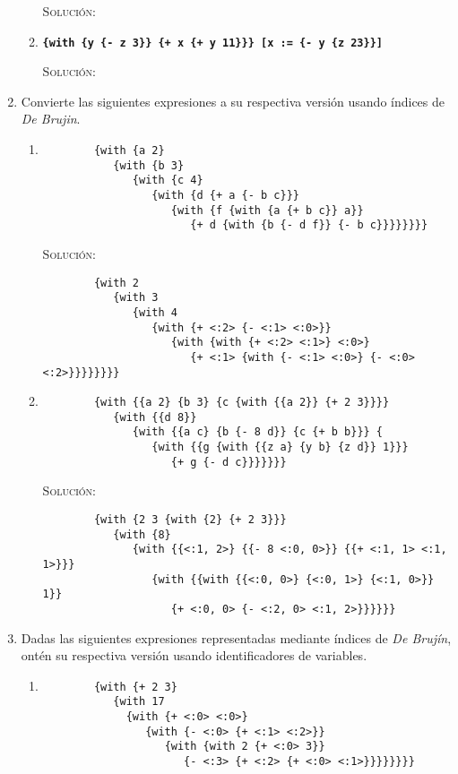 \documentclass[letterpaper,11pt]{article}
\begin{document}
\begin{enumerate}
\begin{enumerate}
        \textsc{Solución:}
        
        \item \texttt{\textbf{\{with \{y \{- z 3\}\} \{+ x \{+ y 11\}\}\} 
        [x := \{- y \{z 23\}\}]}}

        \textsc{Solución:}
    \end{enumerate}

    \item Convierte las siguientes expresiones a su respectiva versión usando
    índices de \textit{De Brujin}.
    \begin{enumerate}
        \item 
        \begin{verbatim}
        {with {a 2} 
           {with {b 3} 
              {with {c 4} 
                 {with {d {+ a {- b c}}} 
                    {with {f {with {a {+ b c}} a}} 
                       {+ d {with {b {- d f}} {- b c}}}}}}}}
        \end{verbatim}

        \textsc{Solución:}
        \begin{verbatim}
        {with 2 
           {with 3 
              {with 4
                 {with {+ <:2> {- <:1> <:0>}} 
                    {with {with {+ <:2> <:1>} <:0>} 
                       {+ <:1> {with {- <:1> <:0>} {- <:0> <:2>}}}}}}}}
        \end{verbatim}

        \item 
        \begin{verbatim}
        {with {{a 2} {b 3} {c {with {{a 2}} {+ 2 3}}}} 
           {with {{d 8}} 
              {with {{a c} {b {- 8 d}} {c {+ b b}}} {
                 {with {{g {with {{z a} {y b} {z d}} 1}}} 
                    {+ g {- d c}}}}}}}
        \end{verbatim}

        \textsc{Solución:}
        \begin{verbatim}
        {with {2 3 {with {2} {+ 2 3}}} 
           {with {8} 
              {with {{<:1, 2>} {{- 8 <:0, 0>}} {{+ <:1, 1> <:1, 1>}}} 
                 {with {{with {{<:0, 0>} {<:0, 1>} {<:1, 0>}} 1}} 
                    {+ <:0, 0> {- <:2, 0> <:1, 2>}}}}}}
        \end{verbatim}
    \end{enumerate}

    \item Dadas las siguientes expresiones representadas mediante índices de 
    \textit{De Brujín}, ontén su respectiva versión usando identificadores de 
    variables.
    \begin{enumerate}
        \item 
        \begin{verbatim}
        {with {+ 2 3} 
           {with 17 
             {with {+ <:0> <:0>} 
                {with {- <:0> {+ <:1> <:2>}} 
                   {with {with 2 {+ <:0> 3}} 
                      {- <:3> {+ <:2> {+ <:0> <:1>}}}}}}}}
        \end{verbatim}


\end{enumerate}
\end{enumerate}
\end{document}
